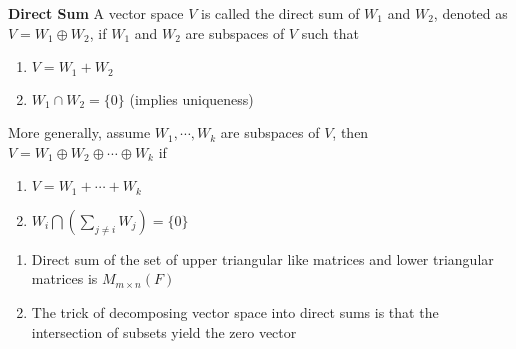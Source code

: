 \documentclass[11pt]{article}
\begin{document}
\begin{defn*}
    \textbf{Direct Sum} A vector space $V$ is called the direct sum of $W_1$ and $W_2$, denoted as $V = W_1 \oplus W_2$, if $W_1$ and $W_2$ are subspaces of $V$ such that 
    \begin{enumerate}
        \item $V = W_1 + W_2$
        \item $W_1 \cap W_2 = \{0\}$ (implies uniqueness)
    \end{enumerate}
    More generally, assume $W_1, \cdots, W_k$ are subspaces of $V$, then $V = W_1 \oplus W_2 \oplus \cdots \oplus W_k$ if
    \begin{enumerate}
        \item $V = W_1 + \cdots + W_k$
        \item $W_i \bigcap (\textstyle\sum_{j\neq i} W_j) = \{ 0\} $
    \end{enumerate}
    \begin{enumerate}
        \item Direct sum of the set of upper triangular like matrices and lower triangular matrices is $M_{m\times n}(F)$
        \item The trick of decomposing vector space into direct sums is that the intersection of subsets yield the zero vector
    \end{enumerate}
\end{defn*}






\end{document}
